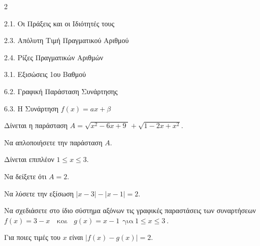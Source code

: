 \begin{ylh}{2}
    \item 2.1. Οι Πράξεις και οι Ιδιότητές τους
    \item 2.3. Απόλυτη Τιμή Πραγματικού Αριθμού
    \item 2.4. Ρίζες Πραγματικών Αριθμών
    \item 3.1. Εξισώσεις 1ου Βαθμού
    \item 6.2. Γραφική Παράσταση Συνάρτησης
    \item 6.3. Η Συνάρτηση $f(x)=ax+\beta$
\end{ylh}
Δίνεται η παράσταση $A=\sqrt{x^{2} - 6x + 9\ } + \sqrt{1 - 2x + x^{2}}$.
\begin{alist}
\item Να απλοποιήσετε την παράσταση $A$.

Δίνεται επιπλέον $1 \leq x \leq 3.$
\item 
\begin{rlist}
\item Να δείξετε ότι $A=2$.
\item Να λύσετε την εξίσωση $|x - 3| - |x - 1| = 2$.
\end{rlist}
\item 
\begin{rlist}
\item Να σχεδιάσετε στο ίδιο σύστημα αξόνων τις γραφικές παραστάσεις των συναρτήσεων $f(x)=3 - x\ \ \ \text{ και}\ \ \ \ g(x) = x - 1\ \ \text{για}\ 1 \leq x \leq 3\ .$
\item Για ποιες τιμές του $x$ είναι $\left| f(x) - g(x) \right|=2$.
\end{rlist}
\end{alist}

